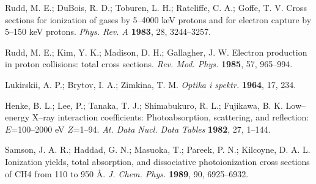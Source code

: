 \documentclass[10pt]{article}
\begin{document}
\begin{thebibliography}{10}
Rudd, M. E.; DuBois, R. D.; Toburen, L. H.; Ratcliffe, C. A.; Goffe, T. V.
Cross sections for ionization of gases by 5--4000 keV protons and for electron capture by 5--150 keV protons.
{\it Phys. Rev. A} {\bf 1983}, 28, 3244--3257.

Rudd, M. E.; Kim, Y. K.; Madison, D. H.; Gallagher, J. W.
Electron production in proton collisions: total cross sections.
{\it Rev. Mod. Phys.} {\bf 1985}, 57, 965--994.

Lukirskii, A. P.; Brytov, I. A.; Zimkina, T. M.
{\it Optika i spektr.} {\bf 1964}, 17, 234.

Henke, B. L.; Lee, P.; Tanaka, T. J.; Shimabukuro, R. L.; Fujikawa, B. K.
Low--energy X--ray interaction coefficients: Photoabsorption, scattering, and reflection: $E$=100--2000 eV $Z$=1--94.
{\it At. Data Nucl. Data Tables} {\bf 1982}, 27, 1--144.

Samson, J. A. R.; Haddad, G. N.; Masuoka, T.; Pareek, P. N.; Kilcoyne, D. A. L.
Ionization yields, total absorption, and dissociative photoionization cross sections of CH4 from 110 to 950 \AA.
{\it J. Chem. Phys.} {\bf 1989}, 90, 6925--6932.

\end{thebibliography}
\end{document}
